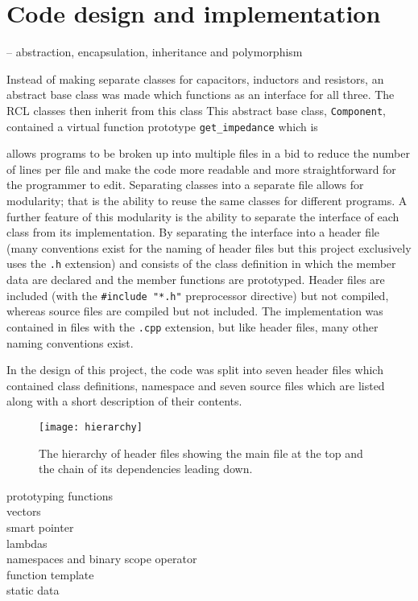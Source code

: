 \section{Code design and implementation}
\label{sec:code}
\CC{} -- abstraction, encapsulation, inheritance and polymorphism


Instead of making separate classes for capacitors, inductors and resistors, an abstract base class was made which functions as an interface for all three. The RCL classes then inherit from this class This abstract base class, \verb!Component!, contained a virtual function prototype \verb!get_impedance! which is


\CC{} allows programs to be broken up into multiple files in a bid to reduce the number of lines per file and make the code more readable and more straightforward for the programmer to edit. Separating classes into a separate file allows for modularity; that is the ability to reuse the same classes for different programs.
A further feature of this modularity is the ability to separate the interface of each class from its implementation. By separating the interface into a header file (many conventions exist for the naming of \CC{} header files but this project exclusively uses the \verb!.h! extension) and consists of the class definition in which the member data are declared and the member functions are prototyped. Header files are included (with the \verb!#include "*.h"! preprocessor directive) but not compiled, whereas source files are compiled but not included. The implementation was contained in files with the \verb!.cpp! extension, but like header files, many other naming conventions exist.


In the design of this project, the code was split into seven header files which contained class definitions, namespace and seven source files which are listed along with a short description of their contents.

\begin{figure}
  \begin{center}
    \texttt{[image: hierarchy]}
  \end{center}
  \caption{The hierarchy of header files showing the main file at the top and the chain of its dependencies leading down.}
  \label{fig:hierarchy}
\end{figure}









prototyping functions\\

vectors\\
smart pointer\\
lambdas\\
namespaces and binary scope operator\\
function template\\
static data\\
